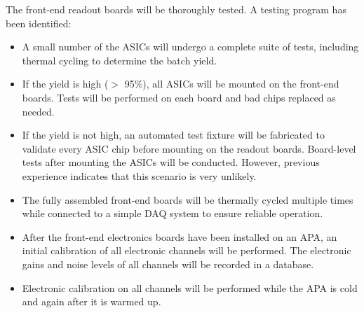The front-end readout boards will be thoroughly tested. A testing program has been identified:
\begin{itemize}
\item A small number of the ASICs will undergo a complete suite 
of tests, including thermal cycling to determine the batch yield.
\item If the yield is high ($>$ 95\%), all ASICs will be mounted 
on the front-end boards.
Tests will be performed on each board and bad chips replaced as needed.
\item If the yield is not high, an automated test fixture will be 
fabricated to validate every ASIC chip before mounting on the readout boards.
Board-level tests after mounting the ASICs will be conducted.
However, previous experience indicates that this scenario is very unlikely.
\item The fully assembled front-end boards will be thermally cycled multiple times while connected
to a simple DAQ system to ensure reliable operation.
\item After the front-end electronics boards have been installed on an APA,
an initial calibration of all electronic channels will be performed.
The electronic gains and noise levels of all channels will be recorded in a database.
\item Electronic calibration on all channels will be performed while the APA is cold and again after it is warmed up.
\end{itemize}

%



%



